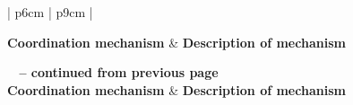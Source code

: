 
\begin{center}
    \begin{longtable}{| p{6cm} | p{9cm} |}

    \hline \textbf{Coordination mechanism} & \textbf{Description of mechanism} \\ \hline
    \endfirsthead

{{\bfseries \tablename\ \thetable{} -- continued from previous page}} \\ \hline
    \textbf{Coordination mechanism} & \textbf{Description of mechanism} \\ \hline
    \endhead

     \\ \hline
    \endfoot

   \endlastfoot


\end{longtable}
\end{center}
